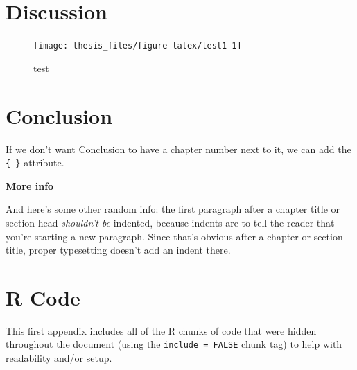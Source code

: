 \documentclass[12pt,oneside]{reedthesis}
\begin{document}
\hypertarget{rmd-discussion}{%
\chapter{Discussion}\label{rmd-discussion}}

\footnotesize
\begin{figure}

{\centering \texttt{[image: thesis\_files/figure-latex/test1-1]} 

}

\caption{test}\label{fig:test1}
\end{figure}
\normalsize

\hypertarget{conclusion}{%
\chapter*{Conclusion}\label{conclusion}}

If we don't want Conclusion to have a chapter number next to it, we can add the \texttt{\{-\}} attribute.

\textbf{More info}

And here's some other random info: the first paragraph after a chapter title or section head \emph{shouldn't be} indented, because indents are to tell the reader that you're starting a new paragraph. Since that's obvious after a chapter or section title, proper typesetting doesn't add an indent there.

\appendix

\hypertarget{r-code}{%
\chapter{R Code}\label{r-code}}

This first appendix includes all of the R chunks of code that were hidden throughout the document (using the \texttt{include\ =\ FALSE} chunk tag) to help with readability and/or setup.
\end{document}
